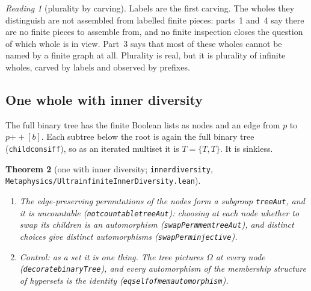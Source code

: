\documentclass[]{article}
\newtheorem{theorem}{Theorem}
\theoremstyle{definition}
\theoremstyle{remark}
\newtheorem{reading}[theorem]{Reading}
\newcommand{\codeus}{\textunderscore\allowbreak}
\newcommand{\code}[1]{\texttt{\let\_\codeus #1}}
\newcommand{\lpath}[1]{{\ttfamily\nolinkurl{#1}}}
\newcommand{\Om}{\Omega}
\newcommand{\meta}[1]{\lpath{Metaphysics/#1.lean}}
\begin{document}
\begin{reading}[plurality by carving]
\label{read:carving}
Labels are the first carving. The wholes they distinguish are not assembled from labelled finite
pieces: parts~1 and~4 say there are no finite pieces to assemble from, and no finite inspection
closes the question of which whole is in view. Part~3 says that most of these wholes cannot be
named by a finite graph at all. Plurality is real, but it is plurality of infinite wholes, carved
by labels and observed by prefixes.
\end{reading}

\subsection{One whole with inner diversity}
\label{sec:inner}

The full binary tree has the finite Boolean lists as nodes and an edge from $p$ to $p\mathbin{+\!\!+}[b]$.
Each subtree below the root is again the full binary tree (\code{child\_cons\_iff}), so as an iterated
multiset it is $T=\{T,T\}$. It is sinkless.

\begin{theorem}[one with inner diversity; \code{inner\_diversity}, \meta{UltrainfiniteInnerDiversity}]
\label{thm:inner}
\leavevmode
\begin{enumerate}
\item The edge-preserving permutations of the nodes form a subgroup \code{treeAut}, and it is
  uncountable (\code{not\_countable\_treeAut}): choosing at each node whether to swap its children
  is an automorphism (\code{swapPerm\_mem\_treeAut}), and distinct choices give distinct automorphisms
  (\code{swapPerm\_injective}).
\item \emph{Control: as a set it is one thing.} The tree pictures $\Om$ at every node
  (\code{decorate\_binaryTree}), and every automorphism of the membership structure of hypersets is
  the identity (\code{eq\_self\_of\_mem\_automorphism}).
\end{enumerate}
\end{theorem}
\end{document}
